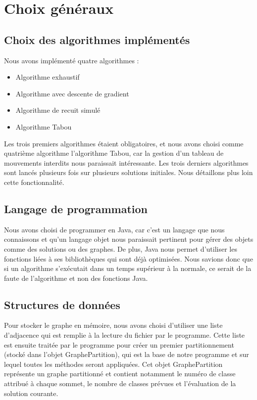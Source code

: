 \documentclass[12pt]{article}
\begin{document}
\newpage	
	
\section{Choix généraux}
\subsection{Choix des algorithmes implémentés}
Nous avons implémenté quatre algorithmes :
	\begin{itemize}
    \item Algorithme exhaustif
    \item Algorithme avec descente de gradient
	\item Algorithme de recuit simulé
	\item Algorithme Tabou
	\end{itemize}
Les trois premiers algorithmes étaient obligatoires, et nous avons choisi comme quatrième algorithme l’algorithme Tabou, car la gestion d’un tableau de mouvements interdits nous paraissait intéressante.
Les trois derniers algorithmes sont lancés plusieurs fois sur plusieurs solutions initiales. Nous détaillons plus loin cette fonctionnalité.

\subsection{Langage de programmation}
    Nous avons choisi de programmer en Java, car c’est un langage que nous connaissons et qu’un langage objet nous paraissait pertinent pour gérer des objets comme des solutions ou des graphes. De plus, Java nous permet d’utiliser les fonctions liées à ses bibliothèques qui sont déjà optimisées. Nous savions donc que si un algorithme s’exécutait dans un temps supérieur à la normale, ce serait de la faute de l’algorithme et non des fonctions Java.

\subsection{Structures de données}
Pour stocker le graphe en mémoire, nous avons choisi d’utiliser une liste d’adjacence qui est remplie à la lecture du fichier par le programme. Cette liste est ensuite traitée par le programme pour créer un premier partitionnement (stocké dans l’objet GraphePartition), qui est la base de notre programme et sur lequel toutes les méthodes seront appliquées. Cet objet GraphePartition représente un graphe partitionné et contient notamment le numéro de classe attribué à chaque sommet, le nombre de classes prévues et l’évaluation de la solution courante.
\end{document}
